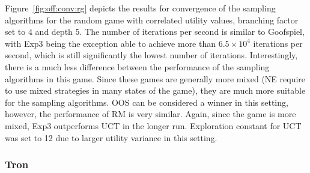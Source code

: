 Figure~\ref{fig:off:conv:rg} depicts the results for convergence of the sampling algorithms for the random game with correlated utility values, branching factor set to $4$ and depth $5$.
The number of iterations per second is similar to Goofspiel, with Exp3 being the exception able to achieve more than $6.5\times10^4$ iterations per second, which is still significantly the lowest number of iterations.
Interestingly, there is a much less difference between the performance of the sampling algorithms in this game.
Since these games are generally more mixed (\ie NE require to use mixed strategies in many states of the game), they are much more suitable for the sampling algorithms.
OOS can be considered a winner in this setting, however, the performance of RM is very similar.
Again, since the game is more mixed, Exp3 outperforms UCT in the longer run.
Exploration constant for UCT was set to 12 due to larger utility variance in this setting.

\subsubsection{Tron}

